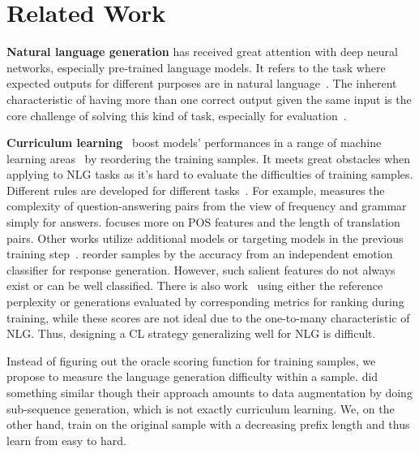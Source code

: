 \section{Related Work}
\textbf{Natural language generation} has received great attention with deep neural networks, especially pre-trained language models. It refers to the task where expected outputs for different purposes are in natural language~\cite{dong2021survey}. The inherent characteristic of having more than one correct output given the same input is the core challenge of solving this kind of task, especially for evaluation~\cite{singh2018does}.



\textbf{Curriculum learning}~\cite{bengio2009curriculum} boost models' performances in a range of machine learning areas~\cite{LiuGW20,varshney2022model} by reordering the training samples.
It meets great obstacles when applying to NLG tasks as it's hard to evaluate the difficulties of training samples. 
Different rules are developed for different tasks~\cite{platanios2019competence,chang2021does}. For example, \cite{liu2018curriculum} measures the complexity of question-answering pairs from the view of frequency and grammar simply for answers. \cite{kocmi2017curriculum} focuses more on POS features and the length of translation pairs.
Other works utilize additional models or targeting models in the previous training step~\cite{zhang-etal-2019-curriculum,zhang2018empirical}. \citet{shen2020cdl} reorder samples by the accuracy from an independent emotion classifier for response generation. However, such salient features do not always exist or can be well classified. There is also work~\cite{zhou2020uncertainty} %
using either the reference perplexity or generations evaluated by corresponding metrics for ranking during training, while these scores are not ideal due to the one-to-many characteristic of NLG. 
Thus, designing a CL strategy generalizing well for NLG is difficult.

Instead of figuring out the oracle scoring function for training samples, 
we propose to measure the language generation difficulty within a sample. 
\citet{liang-etal-2021-token-wise} did something similar though their approach
amounts to data augmentation by doing sub-sequence generation, which is
not exactly curriculum learning. We, on the other hand,  train on the original sample with a decreasing prefix length and thus learn from easy to hard.
